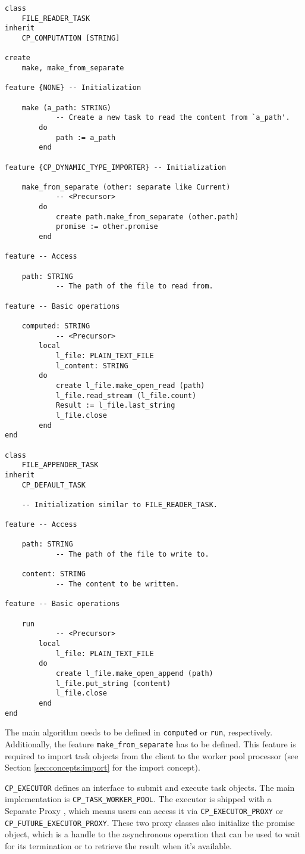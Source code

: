 \begin{lstlisting}[language=OOSC2Eiffel, label={code:file-tasks}, captionpos=b, caption={The file reader and appender classes.}]
class
	FILE_READER_TASK
inherit
	CP_COMPUTATION [STRING]

create
	make, make_from_separate

feature {NONE} -- Initialization

	make (a_path: STRING)
			-- Create a new task to read the content from `a_path'.
		do
			path := a_path
		end

feature {CP_DYNAMIC_TYPE_IMPORTER} -- Initialization

	make_from_separate (other: separate like Current)
			-- <Precursor>
		do
			create path.make_from_separate (other.path)
			promise := other.promise
		end

feature -- Access

	path: STRING
			-- The path of the file to read from.

feature -- Basic operations

	computed: STRING
			-- <Precursor>
		local
			l_file: PLAIN_TEXT_FILE
			l_content: STRING
		do
			create l_file.make_open_read (path)
			l_file.read_stream (l_file.count)
			Result := l_file.last_string
			l_file.close
		end
end

class
	FILE_APPENDER_TASK
inherit
	CP_DEFAULT_TASK

    -- Initialization similar to FILE_READER_TASK.
	
feature -- Access

	path: STRING
			-- The path of the file to write to.

	content: STRING
			-- The content to be written.

feature -- Basic operations

	run
			-- <Precursor>
		local
			l_file: PLAIN_TEXT_FILE
		do
			create l_file.make_open_append (path)
			l_file.put_string (content)
			l_file.close
		end
end
\end{lstlisting}

The main algorithm needs to be defined in \lstinline!computed! or \lstinline!run!, respectively.
Additionally, the feature \lstinline!make_from_separate! has to be defined.
This feature is required to import task objects from the client to the worker pool processor (see Section \ref{sec:concepts:import} for the import concept).

\lstinline!CP_EXECUTOR! defines an interface to submit and execute task objects.
The main implementation is \lstinline!CP_TASK_WORKER_POOL!.
The executor is shipped with a Separate Proxy , which means users can access it via \lstinline!CP_EXECUTOR_PROXY! or \lstinline!CP_FUTURE_EXECUTOR_PROXY!.
These two proxy classes also initialize the promise object, which is a handle to the asynchronous operation that can be used to wait for its termination or to retrieve the result when it's available.

